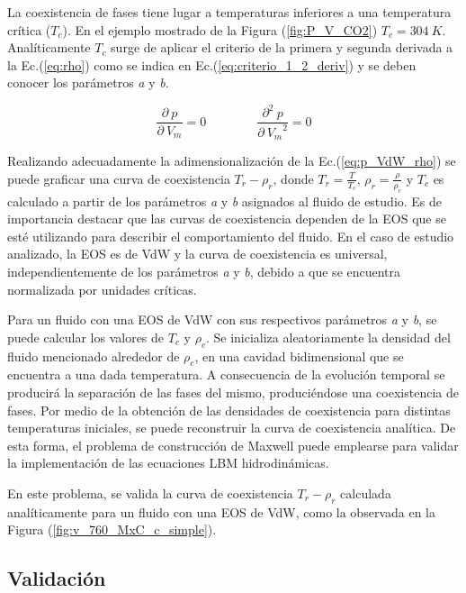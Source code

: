 La coexistencia de fases tiene lugar a temperaturas inferiores a una temperatura crítica ($T_c$). En el ejemplo mostrado de la Figura (\ref{fig:P_V_CO2}) $T_c = 304 \> K$. Analíticamente $T_c$ surge de aplicar el criterio de la primera y segunda derivada a la Ec.(\ref{eq:rho}) como se indica en Ec.(\ref{eq:criterio_1_2_deriv}) y se deben conocer los parámetros \textit{a} y \textit{b}.

\begin{equation}
	\frac{\partial\> p}{\partial\> V_{m}} = 0 \qquad \qquad \frac{\partial^{2} \> p}{\partial\> {V_{m}}^{2}} = 0
	\label{eq:criterio_1_2_deriv}
\end{equation}

Realizando adecuadamente la adimensionalización  de la Ec.(\ref{eq:p_VdW_rho}) se puede graficar una curva de coexistencia $T_r - \rho_r$, donde $T_r = \frac{T}{T_c}$, $\rho_r = \frac{\rho}{\rho_c}$ y $T_c$ es calculado a partir de los parámetros \textit{a} y \textit{b} asignados al fluido de estudio. Es de importancia destacar que las curvas de coexistencia dependen de la EOS que se esté utilizando para describir el comportamiento del fluido. En el caso de estudio analizado, la EOS es de VdW y la curva de coexistencia es universal, independientemente de los parámetros \textit{a} y \textit{b}, debido a que se encuentra normalizada por unidades críticas.

Para un fluido con una EOS de VdW con sus respectivos parámetros \textit{a} y \textit{b}, se puede calcular los valores de $T_c$ y $\rho_c$. Se inicializa aleatoriamente la densidad del fluido mencionado alrededor de $\rho_c$, en una cavidad bidimensional que se encuentra a una dada temperatura. A consecuencia de la evolución temporal se producirá la separación de las fases del mismo, produciéndose una coexistencia de fases. Por medio de la obtención de las densidades de coexistencia para distintas temperaturas iniciales, se puede reconstruir la curva de coexistencia analítica. De esta forma, el problema de construcción de Maxwell puede emplearse para validar la implementación de las ecuaciones LBM hidrodinámicas.

En este problema, se valida la curva de coexistencia $T_r - \rho_r$ calculada analíticamente para un fluido con una EOS de VdW, como la observada en la Figura (\ref{fig:v_760_MxC_c_simple}). 

\subsection{Validación}

